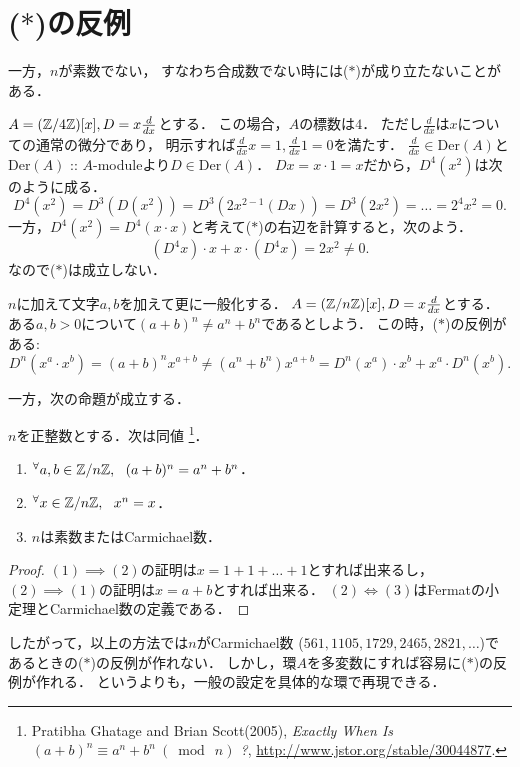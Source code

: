 \documentclass[a4paper]{jsarticle}
\newcommand{\Der}{\mathrm{Der}}
\begin{document}
\section{($*$)の反例}
一方，$n$が素数でない，
すなわち合成数でない時には($*$)が成り立たないことがある．

\begin{Example}
    $A=(\mathbb{Z}/4\mathbb{Z})[x], D=x \frac{d}{dx}$とする．
    この場合，$A$の標数は$4$．
    ただし$\frac{d}{dx}$は$x$についての通常の微分であり，
    明示すれば$\frac{d}{dx} x=1, \frac{d}{dx} 1=0$を満たす．
    $\frac{d}{dx} \in \Der(A)$と$\Der(A)$ :: $A$-moduleより$D \in \Der(A)$．
    $Dx=x \cdot 1=x$だから，$D^4(x^2)$は次のように成る．
    \[ D^4(x^2)=D^3(D(x^2))=D^3(2x^{2-1} (Dx))=D^3(2x^2)=\dots=2^4 x^2=0. \]
    一方，$D^4(x^2)=D^4(x \cdot x)$と考えて($*$)の右辺を計算すると，次のよう．
    \[ (D^4 x) \cdot x+x \cdot (D^4 x)=2x^2 \neq 0. \]
    なので($*$)は成立しない．
\end{Example}

\begin{Example}
    $n$に加えて文字$a,b$を加えて更に一般化する．
    $A=(\mathbb{Z}/n\mathbb{Z})[x], D=x \frac{d}{dx}$とする．
    ある$a,b>0$について$(a+b)^n \neq a^n+b^n$であるとしよう．
    この時，($*$)の反例がある:
    \[ D^n(x^a \cdot x^b)=(a+b)^n x^{a+b} \neq (a^n+b^n)x^{a+b}=D^n(x^a) \cdot x^b+x^a \cdot D^n(x^b). \]
\end{Example}

一方，次の命題が成立する．
\begin{Prop}
    $n$を正整数とする．次は同値
    \footnote
    {
        Pratibha Ghatage and Brian Scott(2005),
        \textit{Exactly When Is $(a + b)^{n} \equiv a^{n} + b^{n} ~(\bmod~ n)$ ?},
        \url{http://www.jstor.org/stable/30044877}.
    }．
    \begin{enumerate}[label=(\arabic*)]
        \item ${}^{\forall} a,b \in \mathbb{Z}/n\mathbb{Z},~~ (a+b)^n=a^n+b^n$．
        \item ${}^{\forall} x \in \mathbb{Z}/n\mathbb{Z},~~ x^n=x$．
        \item $n$は素数またはCarmichael数．
    \end{enumerate}
\end{Prop}
\begin{proof}
    $(1) \implies (2)$の証明は$x=1+1+\dots+1$とすれば出来るし，
    $(2) \implies (1)$の証明は$x=a+b$とすれば出来る．
    $(2) \iff (3)$はFermatの小定理とCarmichael数の定義である．
\end{proof}

したがって，以上の方法では$n$がCarmichael数
($561, 1105, 1729, 2465, 2821, \dots$)であるときの($*$)の反例が作れない．
しかし，環$A$を多変数にすれば容易に($*$)の反例が作れる．
というよりも，一般の設定を具体的な環で再現できる．
\end{document}
